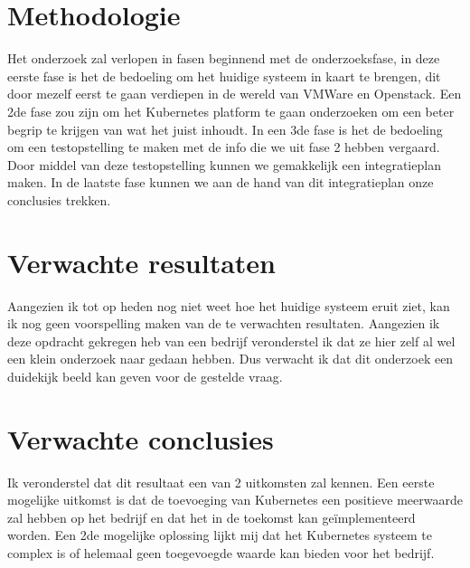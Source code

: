 \documentclass[fleqn,10pt]{voorstel}
\begin{document}
\section{Methodologie}
\label{sec:methodologie}

Het onderzoek zal verlopen in fasen beginnend met de onderzoeksfase, in deze eerste fase is het de bedoeling om het huidige systeem in kaart te brengen, dit door mezelf eerst te gaan verdiepen in de wereld van VMWare en Openstack. Een 2de fase zou zijn om het Kubernetes platform te gaan onderzoeken om een beter begrip te krijgen van wat het juist inhoudt. In een 3de fase is het de bedoeling om een testopstelling te maken met de info die we uit fase 2 hebben vergaard. Door middel van deze testopstelling kunnen we gemakkelijk een integratieplan maken. In de laatste fase kunnen we aan de hand van dit integratieplan onze conclusies trekken.

\section{Verwachte resultaten}
\label{sec:verwachte_resultaten}

Aangezien ik tot op heden nog niet weet hoe het huidige systeem eruit ziet, kan ik nog geen voorspelling maken van de te verwachten resultaten. Aangezien ik deze opdracht gekregen heb van een bedrijf veronderstel ik dat ze hier zelf al wel een klein onderzoek naar gedaan hebben. Dus verwacht ik dat dit onderzoek een duidekijk beeld kan geven voor de gestelde vraag.

\section{Verwachte conclusies}
\label{sec:verwachte_conclusies}

Ik veronderstel dat dit resultaat een van 2 uitkomsten zal kennen. Een eerste mogelijke uitkomst is dat de toevoeging van Kubernetes een positieve meerwaarde zal hebben op het bedrijf en dat het in de toekomst kan geïmplementeerd worden. Een 2de mogelijke oplossing lijkt mij dat het Kubernetes systeem te complex is of helemaal geen toegevoegde waarde kan bieden voor het bedrijf.


\printbibliography[heading=bibintoc]
\end{document}
